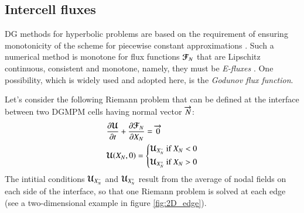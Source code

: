 \subsection{Intercell fluxes}
\label{sec:riemann_solver}

DG methods for hyperbolic problems are based on the requirement of ensuring monotonicity of the scheme for piecewise constant approximations \cite{Cockburn}. 
Such a numerical method is monotone for flux functions ${\boldsymbol{\mathcal{F}}}_N$ that are Lipschitz continuous, consistent and monotone, namely, they must be \textit{E-fluxes} \cite{Osher}.
One possibility, which is widely used and adopted here, is the \textit{Godunov flux function}. 

Let's consider the following Riemann problem that can be defined at the interface between two DGMPM cells having normal vector ${\overrightarrow{N}}$:
\begin{equation}
  \label{eq:RP_mesh}
  \begin{aligned}
    &\frac{\partial {\boldsymbol{\mathcal{U}}}}{\partial t} + \frac{\partial {\boldsymbol{\mathcal{F}}}_N}{\partial X_N} = {\overrightarrow{0}}  \\
    & {\boldsymbol{\mathcal{U}}}(X_N,0)= \left\lbrace 
      \begin{aligned}
        & {\boldsymbol{\mathcal{U}}}_{X_N^-} \text{ if } X_N < 0 \\
        & {\boldsymbol{\mathcal{U}}}_{X_N^{+}} \text{ if } X_N > 0
      \end{aligned}
        \right.
  \end{aligned}
\end{equation}
The intitial conditions ${\boldsymbol{\mathcal{U}}}_{X_N^-}$ and ${\boldsymbol{\mathcal{U}}}_{X_N^{+}}$ result from the average of nodal fields on each side of the interface, so that one Riemann problem is solved at each edge (see a two-dimensional example in figure \ref{fig:2D_edge}).

